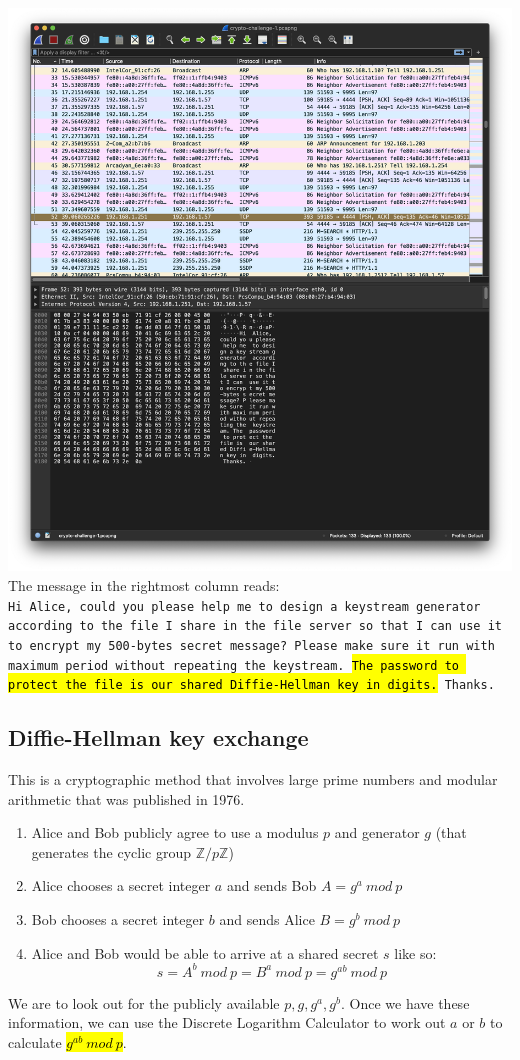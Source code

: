 \documentclass{article}
\begin{document}
	\includegraphics[width=\textwidth,height=\textheight,keepaspectratio]{wireshark}
	The message in the rightmost column reads:\\
	\texttt{Hi Alice, could you please help me to design a keystream generator according to the file I share in the file server so that I can use it to encrypt my 500-bytes secret message? Please make sure it run with maximum period without repeating the keystream. \hl{The password to protect the file is our shared Diffie-Hellman key in digits.} Thanks.}
	
	\subsection{Diffie-Hellman key exchange}
	This is a cryptographic method that involves large prime numbers and modular arithmetic that was published in 1976.
	\begin{enumerate}
		\item Alice and Bob publicly agree to use a modulus $p$ and generator $g$ (that generates the cyclic group $\mathds{Z}/p\mathds{Z}$)
		\item Alice chooses a secret integer $a$ and sends Bob $A = g^a\ mod\ p$
		\item Bob chooses a secret integer $b$ and sends Alice $B = g^b\ mod\ p$
		\item Alice and Bob would be able to arrive at a shared secret $s$ like so:
		\[
			s=A^b\ mod\ p=B^a\ mod\ p=g^{ab}\ mod\ p
		\]
	\end{enumerate}
	We are to look out for the publicly available $p, g, g^a, g^b$. Once we have these information, we can use the Discrete Logarithm Calculator to work out $a$ or $b$ to calculate \hl{$g^{ab}\ mod\ p$}.
	
\end{document}
